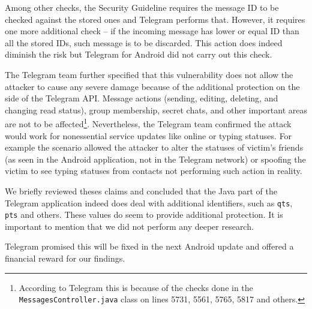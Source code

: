 \documentclass[thesis=M,english]{FITthesis}[2012/10/20]
\begin{document}
Among other checks, the Security Guideline requires \cite{telegram-security-guideline} the message ID to be checked against the stored ones and Telegram performs that. However, it requires one more additional check -- if the incoming message has lower or equal ID than all the stored IDs, such message is to be discarded. This action does indeed diminish the risk but Telegram for Android did not carry out this check.
 
The Telegram team further specified that this vulnerability does not allow the attacker to cause any severe damage because of the additional protection on the side of the Telegram API. Message actions (sending, editing, deleting, and changing read status), group membership, secret chats, and other important areas are not to be affected\footnote{According to Telegram this is because of the checks done in the \texttt{MessagesController.java} class on lines 5731, 5561, 5765, 5817 and others.}. Nevertheless, the Telegram team confirmed the attack would work for nonessential service updates like online or typing statuses. For example the scenario allowed the attacker to alter the statuses of victim's friends (as seen in the Android application, not in the Telegram network) or spoofing the victim to see typing statuses from contacts not performing such action in reality.

We briefly reviewed theses claims and concluded that the Java part of the Telegram application indeed does deal with additional identifiers, such as \texttt{qts}, \texttt{pts} and others. These values do seem to provide additional protection. It is important to mention that we did not perform any deeper research.

Telegram promised this will be fixed in the next Android update and offered a financial reward for our findings.
\end{document}
